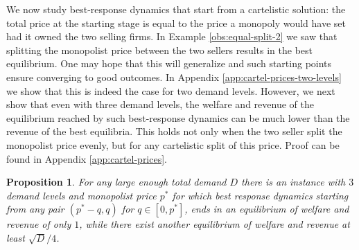 \documentclass[11pt,a4paper]{article}
\newtheorem{proposition}[theorem]{Proposition}
\begin{document}
We now study best-response dynamics that start from a cartelistic solution: the total price at the starting stage is equal to the price a monopoly would have set had it owned the two selling firms.
In Example \ref{obs:equal-split-2}  we saw that splitting the monopolist price between the two sellers results in the best  equilibrium.
One may hope that this will generalize and such starting points ensure converging to good outcomes.
In Appendix \ref{app:cartel-prices-two-levels} we show that this is indeed the case for two demand levels.
%
%
%
%
However, we next show that even with three demand levels, the welfare and revenue of the equilibrium reached by such best-response dynamics can be much lower than the revenue of the best equilibria. This holds not only when the two seller split the monopolist price evenly, but for any cartelistic split of this price. Proof can be found in Appendix \ref{app:cartel-prices}.

\begin{proposition}
	\label{obs:brd-3-lb}
	For any large enough total demand $D$ there is an instance with $3$ demand levels and monopolist price $p^*$ for which best response dynamics
	starting from any pair  $(p^*- q,q)$ for $q\in [0,p^*]$, ends in an equilibrium of welfare and revenue of only $1$, while there exist another equilibrium of welfare and revenue at least $\sqrt{D}/4$.
\end{proposition}
\end{document}
